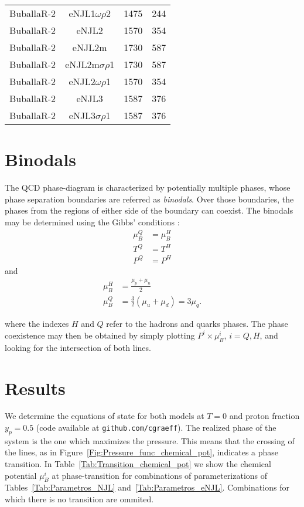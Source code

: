 \documentclass{ws-ijmpcs}
\begin{document}
\begin{table}[!htpb]
\begin{ruledtabular}
\begin{tabular}{cccc}
BuballaR-2 & eNJL1$\omega\rho$2 & 1475 & 244 \\
BuballaR-2 & eNJL2 & 1570 & 354 \\
BuballaR-2 & eNJL2m & 1730 & 587\\
BuballaR-2 & eNJL2m$\sigma\rho$1 & 1730 & 587 \\
BuballaR-2 & eNJL2$\omega\rho$1 & 1570 & 354 \\
BuballaR-2 & eNJL3 & 1587 & 376 \\
BuballaR-2 & eNJL3$\sigma\rho$1 & 1587 & 376 \\
\end{tabular}
\end{ruledtabular}
\end{table}

\columnbreak

\section{Binodals}

The QCD phase-diagram is characterized by potentially multiple phases, whose phase separation boundaries are referred as \emph{binodals}. Over those boundaries, the phases from the regions of either side of the boundary can coexist. The binodals may be determined using the Gibbs' conditions \cite{Cavagnoli2011}:
\begin{align}
\mu_B^Q &= \mu_B^H\\
T^Q &= T^H \\
P^Q &= P^H
\end{align}
%
and
\begin{align}
	\mu_B^H &= \frac{\mu_p + \mu_n}{2} \\
	\mu_B^Q &= \frac{3}{2} (\mu_u + \mu_d) = 3 \mu_q.
\end{align}


\noindent{}where the indexes $H$ and $Q$ refer to the hadrons and quarks phases. The phase coexistence may then be obtained by simply plotting $P^i \times \mu_B^i$, $i = Q, H$, and looking for the intersection of both lines.

\section{Results}

We determine the equations of state for both models at $T = 0$ and proton fraction $y_p = 0.5$ (code available at \texttt{github.com/cgraeff}). The realized phase of the system is the one which maximizes the pressure. This means that the crossing of the lines, as in Figure~\ref{Fig:Pressure_func_chemical_pot}, indicates a phase transition.
%
In Table~\ref{Tab:Transition_chemical_pot} we show the chemical potential $\mu_B^i$ at phase-transition for combinations of parameterizations of Tables~\ref{Tab:Parametros_NJL} and~\ref{Tab:Parametros_eNJL}. Combinations for which there is no transition are ommited.
\end{document}

